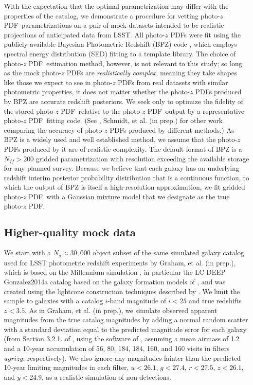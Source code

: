 \documentclass[\docopts]{\docclass}
\newcommand{\pz}{photo-$z$ PDF}
\begin{document}
With the expectation that the optimal parametrization may differ with the
properties of the catalog, we demonstrate a procedure for vetting \pz\
parametrizations on a pair of mock datasets intended to be realistic
projections of anticipated data from LSST.  All \pz s were fit using the
publicly available Bayesian Photometric Redshift (BPZ) code
\citep{benitez_bayesian_2000}, which employs spectral energy distribution (SED)
fitting to a template library.  The choice of \pz\ estimation method, however,
is not relevant to this study; so long as the mock \pz s are
\textit{realistically complex}, meaning they take shapes like those we expect
to see in \pz s from real datasets with similar photometric properties, it does
not matter whether the \pz s produced by BPZ are accurate redshift posteriors.
We seek only to optimize the fidelity of the stored \pz\ relative to the \pz\
output by a representative \pz\ fitting code.  (See
\citet{tanaka_photometric_2017}, Schmidt, et al. (in prep.) for other work
comparing the accuracy of \pz s produced by different methods.)  As BPZ is a
widely used and well established method, we assume that the \pz s produced by
it are of realistic complexity.  The default format of BPZ is a $N_{ff}>200$
gridded parametrization with resolution exceeding the available storage for any
planned survey.  Because we believe that each galaxy has an underlying redshift
interim posterior probability distribution that is a continuous function, to
which the output of BPZ is itself a high-resolution approximation, we fit
gridded \pz\ with a Gaussian mixture model that we designate as the true \pz.

\subsection{Higher-quality mock data}
\label{sec:Euclid}

We start with a $N_{g}\approx30,000$ object subset of the same simulated galaxy
catalog used for LSST photometric redshift experiments by Graham, et al. (in
prep.), which is based on the Millennium simulation
\citep{springel_simulations_2005}, in particular the LC DEEP Gonzalez2014a
catalog based on the galaxy formation models of \cite{gonzalez-perez_how_2014},
and was created using the lightcone construction techniques described by
\cite{merson_lightcone_2013}.  We limit the sample to galaxies with a catalog
$i$-band magnitude of $i<25$ and true redshifts $z<3.5$. As in Graham, et al.
(in prep.), we simulate observed apparent magnitudes from the true catalog
magnitudes by adding a normal random scatter with a standard deviation equal to
the predicted magnitude error for each galaxy (from Section 3.2.1. of
\citealt{ivezic_lsst:_2008}, using the software of
\citealt{connolly_end--end_2014}, assuming a mean airmass of 1.2 and a 10-year
accumulation of 56, 80, 184, 184, 160, and 160 visits in filters $ugrizy$,
respectively).  We also ignore any magnitudes fainter than the predicted
10-year limiting magnitudes in each filter, $u<26.1$, $g<27.4$, $r<27.5$,
$z<26.1$, and $y<24.9$, as a realistic simulation of non-detections.
\end{document}
